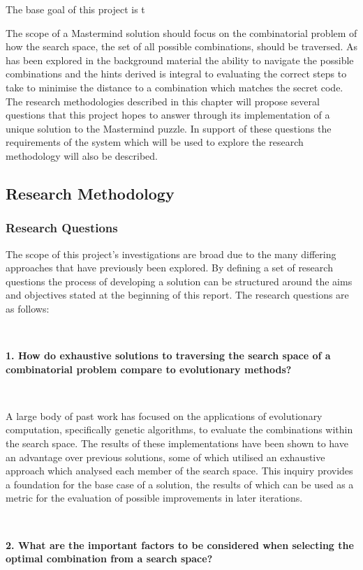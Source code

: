 \documentclass[12pt]{article}  %
\theoremstyle{definition}
\theoremstyle{remark}
\begin{document}
The base goal of this project is t

The scope of a Mastermind solution should focus on the combinatorial problem of how the search space, the set of all possible combinations, should be traversed. As has been explored in the background material the ability to navigate the possible combinations and the hints derived is integral to evaluating the correct steps to take to minimise the distance to a combination which matches the secret code. The research methodologies described in this chapter will propose several questions that this project hopes to answer through its implementation of a unique solution to the Mastermind puzzle. In support of these questions the requirements of the system which will be used to explore the research methodology will also be described.

\subsection {Research Methodology}

\subsubsection {Research Questions}

The scope of this project's investigations are broad due to the many differing approaches that have previously been explored. By defining a set of research questions the process of developing a solution can be structured around the aims and objectives stated at the beginning of this report. The research questions are as follows:

\

\textbf{1. How do exhaustive solutions to traversing the search space of a combinatorial problem compare to evolutionary methods?}

\

A large body of past work has focused on the applications of evolutionary computation, specifically genetic algorithms, to evaluate the combinations within the search space. The results of these implementations have been shown to have an advantage over previous solutions, some of which utilised an exhaustive approach which analysed each member of the search space. This inquiry provides a foundation for the base case of a solution, the results of which can be used as a metric for the evaluation of possible improvements in later iterations.

\

\textbf{2. What are the important factors to be considered when selecting the optimal combination from a search space?}
\end{document}
